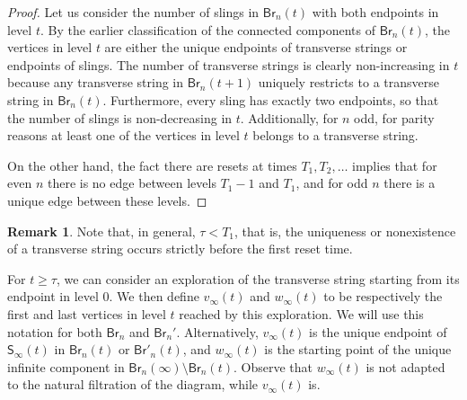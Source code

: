 \documentclass[a4paper,11pt,reqno]{amsart}
\newcommand{\paul}[1]{\todo[color=yellow!70,inline]{Paul: #1}}
\newcommand{\fabian}[1]{\todo[color=red!50,inline]{Fabian: #1}}
\newcommand{\Br}{\mathsf{Br}}
\newcommand{\Soo}{\mathsf{S}_\infty}
\theoremstyle{definition}
\newtheorem{remark}[lemma]{Remark}
\begin{document}
%

\begin{proof}
 Let us consider the number of slings in $\Br_n(t)$ with both endpoints in level $t$. By the earlier classification of the connected components of $\Br_n(t)$, the vertices in level $t$ are either the unique endpoints of transverse strings or endpoints of slings. The number of transverse strings is clearly non-increasing in $t$ because any transverse string in $\Br_n(t+1)$ uniquely restricts to a transverse string in $\Br_n(t)$. Furthermore, every sling has exactly two endpoints, so that the number of slings is non-decreasing in $t$. Additionally, for $n$ odd, for parity reasons at least one of the vertices in level $t$ belongs to a transverse string.
 
 On the other hand, the fact there are resets at times $T_1,T_2,\dots$ implies that for even $n$ there is no edge between levels $T_1-1$ and $T_1$, and for odd $n$ there is a unique edge between these levels. 
\end{proof}

\begin{remark}
Note that, in general, $\tau<T_1$, that is, the uniqueness or nonexistence of a transverse string occurs strictly before the first reset time.
\end{remark}


For $t \geq \tau$, we can consider an exploration of the transverse string starting from its endpoint in level 0. We then define $v_\infty(t)$ and $w_\infty(t)$ to be respectively the first and last vertices in level $t$ reached by this exploration. We will use this notation for both $\Br_n$ and $\Br_n'$. Alternatively, $v_\infty(t)$ is the unique endpoint of $\Soo(t)$ in $\Br_n(t)$ or $\Br'_n(t)$, and $w_\infty(t)$ is the starting point of the unique infinite component in $\Br_n(\infty)\setminus \Br_n(t)$. Observe that $w_\infty(t)$ is not adapted to the natural filtration of the diagram, while $v_\infty(t)$ is. 
\end{document}
